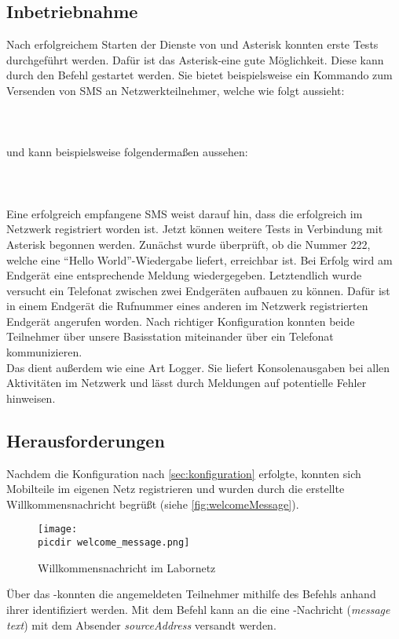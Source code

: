 \subsection{Inbetriebnahme}
\label{sec:inbetriebnahme}
Nach erfolgreichem Starten der Dienste von \OpenBTS und Asterisk konnten erste Tests durchgeführt werden. Dafür ist das Asterisk-\CLI eine gute Möglichkeit. Diese kann durch den Befehl  gestartet werden. Sie bietet beispielsweise ein Kommando zum Versenden von SMS an Netzwerkteilnehmer, welche wie folgt aussieht:\\ \\
\\ \\
und kann beispielsweise folgendermaßen aussehen:\\ \\
\\ \\
Eine erfolgreich empfangene SMS weist darauf hin, dass die \IMSI erfolgreich im Netzwerk registriert worden ist. Jetzt können weitere Tests in Verbindung mit Asterisk begonnen werden. Zunächst wurde überprüft, ob die Nummer 222, welche eine ``Hello World''-Wiedergabe liefert, erreichbar ist. Bei Erfolg wird am Endgerät eine entsprechende Meldung wiedergegeben. Letztendlich wurde versucht ein Telefonat zwischen zwei Endgeräten aufbauen zu können. Dafür ist in einem Endgerät die Rufnummer eines anderen im Netzwerk registrierten Endgerät angerufen worden. Nach richtiger Konfiguration konnten beide Teilnehmer über unsere Basisstation miteinander über ein Telefonat kommunizieren. \\
Das \CLI dient außerdem wie eine Art Logger. Sie liefert Konsolenausgaben bei allen Aktivitäten im Netzwerk und lässt durch Meldungen auf potentielle Fehler hinweisen. 

\subsection{Herausforderungen}
\label{sec:herausforderung}
Nachdem die Konfiguration nach \autoref{sec:konfiguration} erfolgte, konnten sich Mobilteile im eigenen Netz registrieren und wurden durch die erstellte Willkommensnachricht begrüßt (siehe \autoref{fig:welcomeMessage}).

\begin{figure}[h!]
	\centering
	\texttt{[image: \\picdir welcome\_message.png]}
	\caption{Willkommensnachricht im Labornetz}
	\label{fig:welcomeMessage}
	
\end{figure}
Über das \OpenBTS-\CLI konnten die angemeldeten Teilnehmer mithilfe des Befehls  anhand ihrer \IMSI identifiziert werden. Mit dem Befehl  kann an die \emph{\IMSI} eine \SMS-Nachricht (\emph{message text}) mit dem Absender \emph{sourceAddress} versandt werden.

